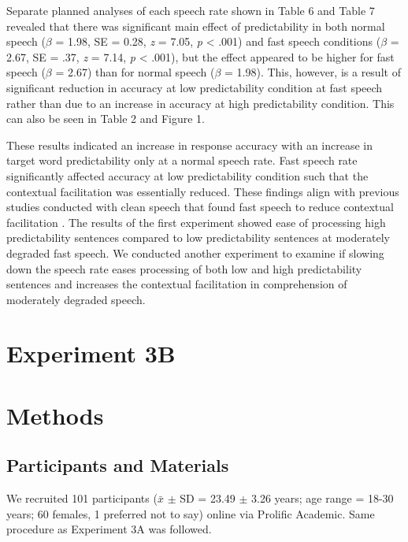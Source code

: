\documentclass[a4paper, nobind]{templates/ociamthesis}
\begin{document}
Separate planned analyses of each speech rate shown in Table 6 and Table 7 revealed that there was significant main effect of predictability in both normal speech (\(\beta\) = 1.98, SE = 0.28, \emph{z} = 7.05, \emph{p} \textless{} .001) and fast speech conditions (\(\beta\) = 2.67, SE = .37, \emph{z} = 7.14, \emph{p} \textless{} .001),
but the effect appeared to be higher for fast speech (\(\beta\) = 2.67) than for normal speech (\(\beta\) = 1.98).
This, however, is a result of significant reduction in accuracy at low predictability condition at fast speech rather than due to an increase in accuracy at high predictability condition. This can also be seen in Table 2 and Figure 1.

These results indicated an increase in response accuracy with an increase in target word predictability only at a normal speech rate.
Fast speech rate significantly affected accuracy at low predictability condition such that the contextual facilitation was essentially reduced.
These findings align with previous studies conducted with clean speech that found fast speech to reduce contextual facilitation \autocite[e.g.,][]{Aydelott2004}.
The results of the first experiment showed ease of processing high predictability sentences compared to low predictability sentences at moderately degraded fast speech.
We conducted another experiment to examine if slowing down the speech rate eases processing of both low and high predictability sentences and increases the contextual facilitation in comprehension of moderately degraded speech.

\hypertarget{experiment-3b}{%
\section{Experiment 3B}\label{experiment-3b}}

\hypertarget{methods-4}{%
\section{Methods}\label{methods-4}}

\hypertarget{participants-and-materials-1}{%
\subsection{Participants and Materials}\label{participants-and-materials-1}}

We recruited 101 participants (\(\bar{x}\) \(\pm\) SD = 23.49 \(\pm\) 3.26 years; age range = 18-30 years; 60 females, 1 preferred not to say) online via Prolific Academic.
Same procedure as Experiment 3A was followed.
\end{document}
